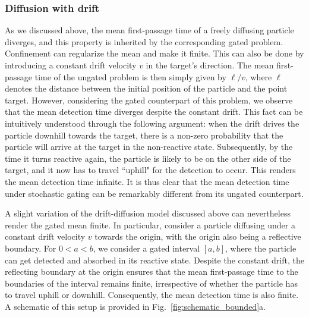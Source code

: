 

\subsubsection*{Diffusion with drift} \label{Sec:6}

As we discussed above, the mean first-passage time of a freely diffusing particle diverges, and this property is inherited by the corresponding gated problem. Confinement can regularize the mean and make it finite. This can also be done by introducing a constant drift velocity $v$ in the target's direction. The mean first-passage time of the ungated problem is then simply given by $\ell/v$, where $\ell$ denotes the distance between the initial position of the particle and the point target. However, considering the gated counterpart of this problem, we observe that the mean detection time diverges despite the constant drift. This fact can be intuitively understood through the following argument: when the drift drives the particle downhill towards the target, there is a non-zero probability that the particle will arrive at the target in the non-reactive state. Subsequently, by the time it turns reactive again, the particle is likely to be on the other side of the target, and it now has to travel ``uphill" for the detection to occur. This renders the mean detection time infinite.  It is thus clear that the mean detection time under stochastic gating can be remarkably different from its ungated counterpart.

A slight variation of the drift-diffusion model discussed above can nevertheless render the gated mean finite. In particular, consider a particle diffusing under a constant drift velocity $v$ towards the origin, with the origin also being a reflective boundary. For $0<a<b$, we consider a gated interval $[a,b]$, where the particle can get detected and absorbed in its reactive state. Despite the constant drift, the reflecting boundary at the origin ensures that the mean first-passage time to the boundaries of the interval remains finite, irrespective of whether the particle has to travel uphill or downhill. Consequently, the mean detection time is also finite. A schematic of this setup is provided in Fig.~\ref{fig:schematic_bounded}a.

